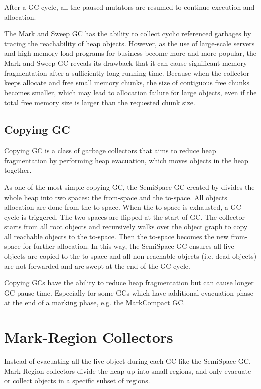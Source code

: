 After a GC cycle, all the paused mutators are resumed to continue execution and allocation.

The Mark and Sweep GC has the ability to collect cyclic referenced garbages by tracing
the reachability of heap objects. However, as the use of large-scale servers and
high memory-load programs for business become more and more popular, the Mark and Sweep GC 
reveals its drawback that it can cause significant memory fragmentation after a
sufficiently long running time. Because when the collector keeps allocate and free
small memory chunks, the size of contiguous free chunks becomes smaller, which may
lead to allocation failure for large objects, even if the total free memory size
is larger than the requested chunk size.

\subsection{Copying GC}

Copying GC is a class of garbage collectors that aims to reduce heap fragmentation
by performing heap evacuation, which moves objects in the heap together.

As one of the most simple copying GC, the SemiSpace GC created by \cite{fenichel1969lisp} divides the whole heap
into two spaces: the from-space and the to-space. All objects allocation are done
from the to-space. When the to-space is exhausted, a GC cycle is triggered.
The two spaces are flipped at the start of GC.
The collector starts from all root objects and recursively walks over the
object graph to copy all reachable objects to the to-space. Then the to-space becomes
the new from-space for further allocation. In this way, the SemiSpace GC ensures all
live objects are copied to the to-space and all non-reachable objects (i.e. dead objects)
are not forwarded and are swept at the end of the GC cycle.

Copying GCs have the ability to reduce heap fragmentation but can cause longer
GC pause time. Especially for some GCs which have additional evacuation
phase at the end of a marking phase, e.g. the MarkCompact GC.

\section{Mark-Region Collectors}

Instead of evacuating all the live object during each GC like the SemiSpace GC,
Mark-Region collectors divide the heap up into small regions, and only evacuate
or collect objects in a specific subset of regions.

